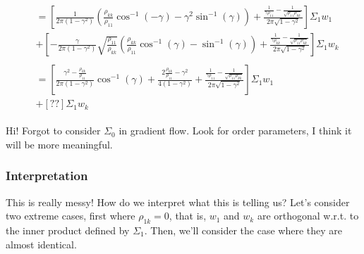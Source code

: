 \documentclass{article}
\begin{document}
\begin{align}
  &\begin{multlined} = \left[ \frac{1}{2\pi (1 - \gamma^2) } \left( \frac{ \rho_{kk} }{ \rho_{11} } \cos^{-1}(-\gamma) - \gamma^2 \sin^{-1}(\gamma) \right) 
    + \frac{ \frac{1}{\gamma \rho_{11}} - \frac{1}{\sqrt{ \rho_{11}\rho_{kk} }} }{ 2\pi \sqrt{1-\gamma^2} }
     \right] \Sigma_1 w_1  \\
    + \left[ -\frac{ \gamma }{2\pi (1 - \gamma^2) } \sqrt{\frac{\rho_{11}}{\rho_{kk}}} \left( \frac{\rho_{kk}}{\rho_{11}} \cos^{-1}(\gamma) - \sin^{-1}(\gamma) \right)
    + \frac{ \frac{1}{ \gamma \rho_{kk} } - \frac{1}{ \sqrt{ \rho_{11}\rho_{kk} }  }  }{ 2\pi \sqrt{1-\gamma^2} }
    \right] \Sigma_1 w_k
  \end{multlined} \\
  &\begin{multlined} = \left[ \frac{\gamma^{2}-\frac{\rho_{kk}}{\rho_{11}}}{2\pi(1-\gamma^{2})}\cos^{-1}\left(\gamma\right)+\frac{2\frac{\rho_{kk}}{\rho_{11}}-\gamma^{2}}{4(1-\gamma^{2})}+\frac{\frac{1}{\gamma\rho_{11}}-\frac{1}{\sqrt{\rho_{11}\rho_{kk}}}}{2\pi\sqrt{1-\gamma^{2}}} \right] \Sigma_1 w_1  \\
    + \left[ ?? \right] \Sigma_1 w_k
  \end{multlined}
\end{align}


\newpage
Hi!
\newpage
Forgot to consider $\Sigma_0$ in gradient flow.
Look for order parameters, I think it will be more meaningful.
\subsubsection*{Interpretation}
This is really messy!
How do we interpret what this is telling us?
Let's consider two extreme cases, first where $\rho_{1k} = 0$, that is, $w_1$ and $w_k$ are orthogonal w.r.t. to the inner product defined by $\Sigma_1$.
Then, we'll consider the case where they are almost identical.
\end{document}
